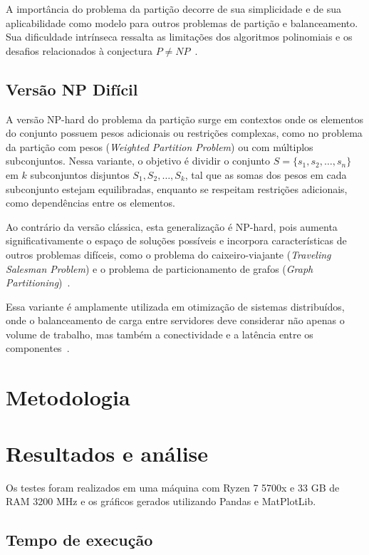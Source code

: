 \documentclass{article}
\begin{document}
A importância do problema da partição decorre de sua simplicidade e de sua aplicabilidade como modelo para outros problemas de partição e balanceamento. Sua dificuldade intrínseca ressalta as limitações dos algoritmos polinomiais e os desafios relacionados à conjectura $P \neq NP$~\cite{papadimitriou1994computational}.


\subsection{Versão NP Difícil}

A versão NP-hard do problema da partição surge em contextos onde os elementos do conjunto possuem pesos adicionais ou restrições complexas, como no problema da partição com pesos (\textit{Weighted Partition Problem}) ou com múltiplos subconjuntos. Nessa variante, o objetivo é dividir o conjunto $S = \{s_1, s_2, \dots, s_n\}$ em $k$ subconjuntos disjuntos \( S_1, S_2, \dots, S_k \), tal que as somas dos pesos em cada subconjunto estejam equilibradas, enquanto se respeitam restrições adicionais, como dependências entre os elementos.

Ao contrário da versão clássica, esta generalização é NP-hard, pois aumenta significativamente o espaço de soluções possíveis e incorpora características de outros problemas difíceis, como o problema do caixeiro-viajante (\textit{Traveling Salesman Problem}) e o problema de particionamento de grafos (\textit{Graph Partitioning})~\cite{garey1979computers, papadimitriou1994computational}. 

Essa variante é amplamente utilizada em otimização de sistemas distribuídos, onde o balanceamento de carga entre servidores deve considerar não apenas o volume de trabalho, mas também a conectividade e a latência entre os componentes~\cite{martello1981knapsack}.


\section{Metodologia}


\section{Resultados e análise}
Os testes foram realizados em uma máquina com Ryzen 7 5700x e 33 GB de RAM 3200 MHz e os gráficos gerados utilizando Pandas e MatPlotLib.

\subsection{Tempo de execução}
\end{document}

